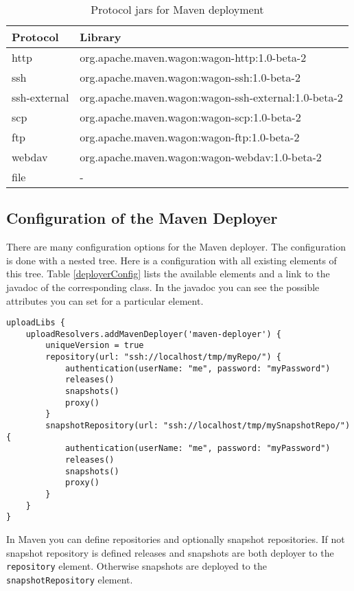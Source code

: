 \begin{table}
	\begin{center}
	\begin{tabular}{|l|l|} \hline
	\textbf{Protocol} & \textbf{Library} \\ \hline
	http & org.apache.maven.wagon:wagon-http:1.0-beta-2 \\ \hline
	ssh & org.apache.maven.wagon:wagon-ssh:1.0-beta-2 \\ \hline
	ssh-external & org.apache.maven.wagon:wagon-ssh-external:1.0-beta-2 \\ \hline
	scp & org.apache.maven.wagon:wagon-scp:1.0-beta-2 \\ \hline
	ftp & org.apache.maven.wagon:wagon-ftp:1.0-beta-2 \\ \hline
	webdav & org.apache.maven.wagon:wagon-webdav:1.0-beta-2 \\ \hline
	file & - \\ \hline
	\end{tabular}
	\end{center}
	\caption{Protocol jars for Maven deployment}	
	\label{wagonLibs}
\end{table}
\subsection{Configuration of the Maven Deployer} %
\label{sub:configuration_of_the_maven_deployer}
There are many configuration options for the Maven deployer. The configuration is done with a nested tree. Here is a configuration with all existing elements of this tree. Table \ref{deployerConfig} lists the available elements and a link to the javadoc of the corresponding class. In the javadoc you can see the possible attributes you can set for a particular element.
\begin{Verbatim}
uploadLibs {
    uploadResolvers.addMavenDeployer('maven-deployer') {
        uniqueVersion = true
        repository(url: "ssh://localhost/tmp/myRepo/") {
			authentication(userName: "me", password: "myPassword")
			releases()
			snapshots()
			proxy()
        }
		snapshotRepository(url: "ssh://localhost/tmp/mySnapshotRepo/") {
			authentication(userName: "me", password: "myPassword")
			releases()
			snapshots()
			proxy()
        }
    }
}
\end{Verbatim}
In Maven you can define repositories and optionally snapshot repositories. If not snapshot repository is defined releases and snapshots are both deployer to the \texttt{repository} element. Otherwise snapshots are deployed to the \texttt{snapshotRepository} element.

